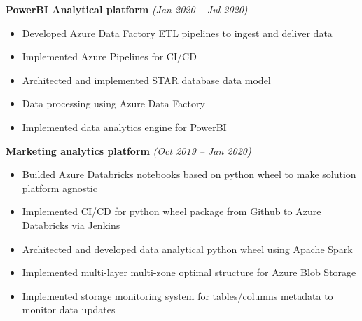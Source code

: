 \textbf{PowerBI Analytical platform} \textit{(Jan 2020 -- Jul 2020)}
\cvexpspace
\begin{itemize}
  \cvitemsep
  \item Developed Azure Data Factory ETL pipelines to ingest and deliver data
  \item Implemented Azure Pipelines for CI/CD
  \item Architected and implemented STAR database data model
  \item Data processing using Azure Data Factory
  \item Implemented data analytics engine for PowerBI
\end{itemize}

\textbf{Marketing analytics platform} {\textit{(Oct 2019 -- Jan 2020)}}
\cvexpspace
\begin{itemize}
  \cvitemsep
  \item Builded Azure Databricks notebooks based on python wheel
        to make solution platform agnostic
  \item Implemented CI/CD for python wheel package from Github
        to Azure Databricks via Jenkins
  \item Architected and developed data analytical
        python wheel using Apache Spark
  \item Implemented multi-layer multi-zone optimal
        structure for Azure Blob Storage
  \item Implemented storage monitoring system
        for tables/columns metadata to monitor data updates
\end{itemize}
